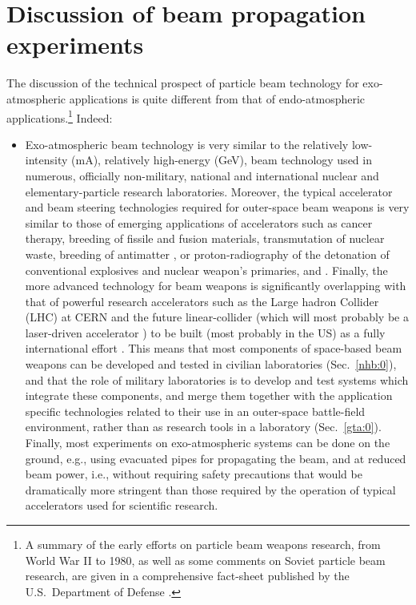 \documentclass [12pt,a4paper,     ]{report} %
\begin{document}
\section{Discussion of beam propagation experiments}
\label{exp:0}


The discussion of the technical prospect of particle beam technology for  exo-atmospheric applications is quite different from that of endo-atmospheric applications.\footnote{A summary of the early efforts on particle beam weapons research, from World War II to 1980, as well as some comments on Soviet particle beam research, are given in a comprehensive fact-sheet published by the U.S.\ Department of Defense \cite{USDOD1980-}.}  Indeed:

\begin{itemize}

\item Exo-atmospheric beam technology is very similar to the relatively low-intensity (mA), relatively high-energy (GeV), beam technology used in numerous, officially non-military, national and international nuclear and elementary-particle research laboratories.  Moreover, the typical accelerator and beam steering technologies required for outer-space beam weapons is very similar to those of emerging applications of accelerators such as cancer therapy, breeding of fissile and fusion materials, transmutation of nuclear waste, breeding of antimatter \cite{GSPON1987A}, or proton-radiography of the detonation of conventional explosives and nuclear weapon's primaries, \cite{HARTO2000-} and \cite[p.84--89]{CUNNI2003-}.  Finally, the more advanced technology for beam weapons is significantly overlapping with that of powerful research accelerators such as the Large hadron Collider (LHC) at CERN and the future linear-collider (which will most probably be a laser-driven accelerator \cite{KATSO2004-}) to be built (most probably in the US) as a fully international effort \cite{CERN-2002-}.  This means that most components of space-based beam weapons can be developed and tested in civilian laboratories  (Sec.~\ref{nhb:0}), and that the role of military laboratories is to develop and test systems which integrate these components, and merge them together with the application specific technologies related to their use in an outer-space battle-field environment, rather than as research tools in a laboratory (Sec.~\ref{gta:0}).  Finally, most experiments on exo-atmospheric systems can be done on the ground, e.g., using evacuated pipes for propagating the beam, and at reduced beam power, i.e., without requiring safety precautions that would be dramatically more stringent than those required by the operation of typical accelerators used for scientific research.



\end{itemize}
\end{document}
